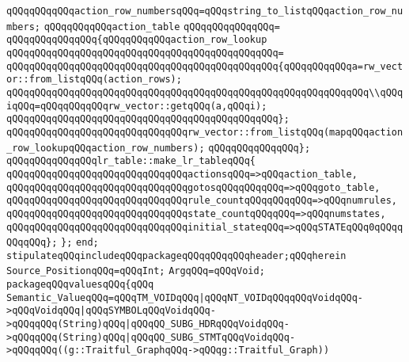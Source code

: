 \verb|qQQqqQQqqQQqaction_row_numbersqQQq=qQQqstring_to_listqQQqaction_row_numbers;|\newline
\verb|qQQqqQQqqQQqaction_table|\newline
\verb|qQQqqQQqqQQqqQQq=|\newline
\verb|qQQqqQQqqQQqqQQq{qQQqqQQqqQQqaction_row_lookup|\newline
\verb|qQQqqQQqqQQqqQQqqQQqqQQqqQQqqQQqqQQqqQQqqQQqqQQq=|\newline
\verb|qQQqqQQqqQQqqQQqqQQqqQQqqQQqqQQqqQQqqQQqqQQqqQQq{qQQqqQQqqQQqa=rw_vector::from_listqQQq(action_rows);|\newline
\newline
\verb|qQQqqQQqqQQqqQQqqQQqqQQqqQQqqQQqqQQqqQQqqQQqqQQqqQQqqQQqqQQqqQQq\\qQQqiqQQq=qQQqqQQqqQQqrw_vector::getqQQq(a,qQQqi);|\newline
\verb|qQQqqQQqqQQqqQQqqQQqqQQqqQQqqQQqqQQqqQQqqQQqqQQq};|\newline
\newline
\verb|qQQqqQQqqQQqqQQqqQQqqQQqqQQqqQQqrw_vector::from_listqQQq(mapqQQqaction_row_lookupqQQqaction_row_numbers);|\newline
\verb|qQQqqQQqqQQqqQQq};|\newline
\newline
\verb|qQQqqQQqqQQqqQQqlr_table::make_lr_tableqQQq{|\newline
\verb|qQQqqQQqqQQqqQQqqQQqqQQqqQQqqQQqactionsqQQq=>qQQqaction_table,|\newline
\verb|qQQqqQQqqQQqqQQqqQQqqQQqqQQqqQQqgotosqQQqqQQqqQQq=>qQQqgoto_table,|\newline
\verb|qQQqqQQqqQQqqQQqqQQqqQQqqQQqqQQqrule_countqQQqqQQqqQQq=>qQQqnumrules,|\newline
\verb|qQQqqQQqqQQqqQQqqQQqqQQqqQQqqQQqstate_countqQQqqQQq=>qQQqnumstates,|\newline
\verb|qQQqqQQqqQQqqQQqqQQqqQQqqQQqqQQqinitial_stateqQQq=>qQQqSTATEqQQq0qQQqqQQqqQQq};|\newline
\verb|};|\newline
\verb|end;|\newline
\verb|stipulateqQQqincludeqQQqpackageqQQqqQQqqQQqheader;qQQqherein|\newline
\verb|Source_PositionqQQq=qQQqInt;|\newline
\verb|ArgqQQq=qQQqVoid;|\newline
\verb|packageqQQqvaluesqQQq{qQQq|\newline
\verb|Semantic_ValueqQQq=qQQqTM_VOIDqQQq|\verb#|qQQqNT_VOIDqQQqqQQqVoidqQQq->qQQqVoidqQQq|qQQqSYMBOLqQQqVoidqQQq->qQQqqQQq(String)qQQq|qQQqQQ_SUBG_HDRqQQqVoidqQQq->qQQqqQQq(String)qQQq|qQQqQQ_SUBG_STMTqQQqVoidqQQq->qQQqqQQq((g::Traitful_GraphqQQq->qQQqg::Traitful_Graph))#\newline
